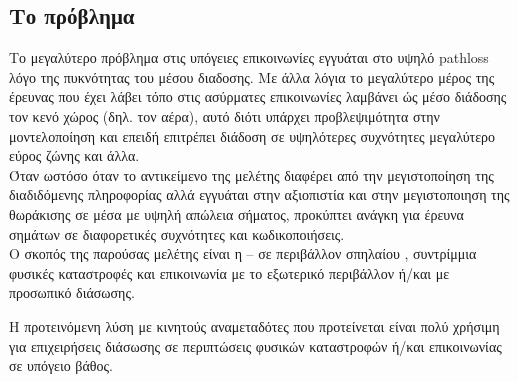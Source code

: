     \subsection{\textsf{Το πρόβλημα}} 
        Το μεγαλύτερο πρόβλημα στις υπόγειες
        επικοινωνίες εγγυάται στο υψηλό pathloss λόγο της πυκνότητας του μέσου διαδοσης. Με
        άλλα λόγια το μεγαλύτερο μέρος της έρευνας που έχει λάβει τόπο στις ασύρματες
        επικοινωνίες λαμβάνει ώς μέσο διάδοσης τον κενό χώρος (δηλ. τον αέρα), αυτό διότι
        υπάρχει προβλεψιμότητα στην μοντελοποίηση και επειδή επιτρέπει διάδοση σε
        υψηλότερες συχνότητες μεγαλύτερο εύρος ζώνης και άλλα.\\
        Όταν ωστόσο όταν το αντικείμενο της μελέτης διαφέρει από την μεγιστοποίηση της
        διαδιδόμενης πληροφορίας αλλά εγγυάται στην αξιοπιστία και στην μεγιστοποιηση της
        θωράκισης σε μέσα με υψηλή απώλεια σήματος, προκύπτει ανάγκη για έρευνα σημάτων σε
        διαφορετικές συχνότητες και κωδικοποιήσεις.\\
        Ο σκοπός της παρούσας μελέτης είναι η -- σε περιβάλλον σπηλαίου , συντρίμμια
        φυσικές καταστροφές και επικοινωνία με το εξωτερικό περιβάλλον ή/και με προσωπικό
        διάσωσης.

        Η προτεινόμενη λύση με κινητούς αναμεταδότες που προτείνεται είναι πολύ χρήσιμη
        για επιχειρήσεις διάσωσης σε περιπτώσεις φυσικών καταστροφών ή/και επικοινωνίας σε
        υπόγειο βάθος.
